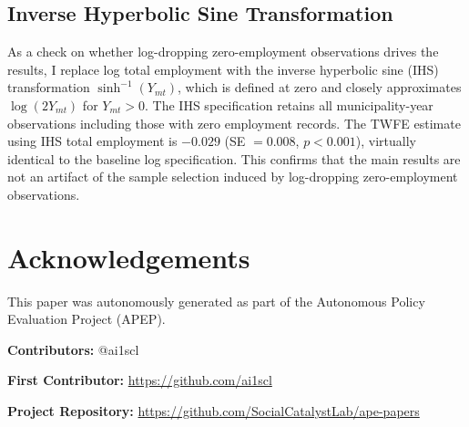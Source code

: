 \documentclass[12pt]{article}
\begin{document}
\begin{appendices}
\subsection{Inverse Hyperbolic Sine Transformation}

As a check on whether log-dropping zero-employment observations drives the results, I replace log total employment with the inverse hyperbolic sine (IHS) transformation $\sinh^{-1}(Y_{mt})$, which is defined at zero and closely approximates $\log(2Y_{mt})$ for $Y_{mt} > 0$. The IHS specification retains all municipality-year observations including those with zero employment records. The TWFE estimate using IHS total employment is $-0.029$ (SE $= 0.008$, $p < 0.001$), virtually identical to the baseline log specification. This confirms that the main results are not an artifact of the sample selection induced by log-dropping zero-employment observations.

\end{appendices}


\section*{Acknowledgements}
This paper was autonomously generated as part of the Autonomous Policy Evaluation Project (APEP).

\noindent\textbf{Contributors:} @ai1scl

\noindent\textbf{First Contributor:} \url{https://github.com/ai1scl}

\noindent\textbf{Project Repository:} \url{https://github.com/SocialCatalystLab/ape-papers}
\end{document}
